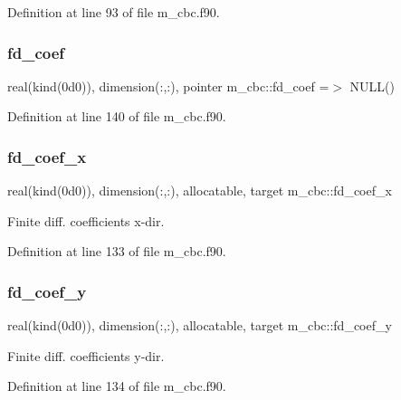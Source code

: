 Definition at line 93 of file m\+\_\+cbc.\+f90.

\mbox{\label{namespacem__cbc_a5950f5d9fbc613591a42a3f9587f32f5}} 
\subsubsection{\texorpdfstring{fd\+\_\+coef}{fd\_coef}}
{\footnotesize\ttfamily real(kind(0d0)), dimension(\+:,\+:), pointer m\+\_\+cbc\+::fd\+\_\+coef =$>$ N\+U\+LL()}



Definition at line 140 of file m\+\_\+cbc.\+f90.

\mbox{\label{namespacem__cbc_a6f324c692d5e60e85314b1e21c81736b}} 
\subsubsection{\texorpdfstring{fd\+\_\+coef\+\_\+x}{fd\_coef\_x}}
{\footnotesize\ttfamily real(kind(0d0)), dimension(\+:,\+:), allocatable, target m\+\_\+cbc\+::fd\+\_\+coef\+\_\+x}



Finite diff. coefficients x-\/dir. 



Definition at line 133 of file m\+\_\+cbc.\+f90.

\mbox{\label{namespacem__cbc_ae86e3f027b189005a2b00f8f2bb9ae32}} 
\subsubsection{\texorpdfstring{fd\+\_\+coef\+\_\+y}{fd\_coef\_y}}
{\footnotesize\ttfamily real(kind(0d0)), dimension(\+:,\+:), allocatable, target m\+\_\+cbc\+::fd\+\_\+coef\+\_\+y}



Finite diff. coefficients y-\/dir. 



Definition at line 134 of file m\+\_\+cbc.\+f90.

